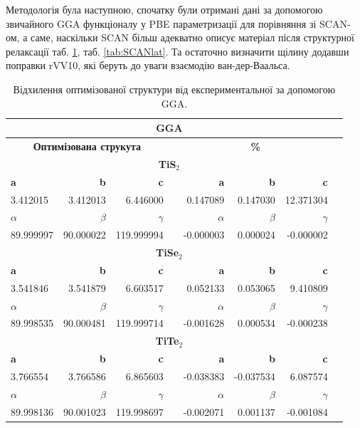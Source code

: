 Методологія була наступною, спочатку були отримані дані за допомогою звичайного GGA функціоналу у PBE параметризації для порівняння зі SCAN-ом, а саме, наскільки SCAN більш адекватно описує матеріал після структурної релаксації таб. \ref{tab:GGAlat}, таб. \ref{tab:SCANlat}. Та остаточно визначити щілину додавши поправки rVV10, які беруть до уваги взаємодію ван-дер-Ваальса.

\begin{table}[!htp]\centering
\scriptsize
\begin{tabular}{lrrrrrrr}\toprule
\multicolumn{7}{c}{\textbf{GGA}} \\\midrule
\multicolumn{3}{c}{\textbf{Оптимізована струкута}} & &\multicolumn{3}{c}{\textbf{\%}} \\
\multicolumn{7}{c}{\textbf{TiS$_2$}} \\
\textbf{a} &\textbf{b} &\textbf{c} & &\textbf{a} &\textbf{b} &\textbf{c} \\
3.412015 &3.412013 &6.446000 & &0.147089 &0.147030 &12.371304 \\
\textbf{$\alpha$} &\textbf{$\beta$} &\textbf{$\gamma$} & &\textbf{$\alpha$} &\textbf{$\beta$} &\textbf{$\gamma$} \\
89.999997 &90.000022 &119.999994 & &-0.000003 &0.000024 &-0.000002 \\
\multicolumn{7}{c}{\textbf{TiSe$_2$}} \\
\textbf{a} &\textbf{b} &\textbf{c} & &\textbf{a} &\textbf{b} &\textbf{c} \\
3.541846 &3.541879 &6.603517 & &0.052133 &0.053065 &9.410809 \\
\textbf{$\alpha$} &\textbf{$\beta$} &\textbf{$\gamma$} & &\textbf{$\alpha$} &\textbf{$\beta$} &\textbf{$\gamma$} \\
89.998535 &90.000481 &119.999714 & &-0.001628 &0.000534 &-0.000238 \\
\multicolumn{7}{c}{\textbf{TiTe$_2$}} \\
\textbf{a} &\textbf{b} &\textbf{c} & &\textbf{a} &\textbf{b} &\textbf{c} \\
3.766554 &3.766586 &6.865603 & &-0.038383 &-0.037534 &6.087574 \\
\textbf{$\alpha$} &\textbf{$\beta$} &\textbf{$\gamma$} & &\textbf{$\alpha$} &\textbf{$\beta$} &\textbf{$\gamma$} \\
89.998136 &90.001023 &119.998697 & &-0.002071 &0.001137 &-0.001084 \\
\bottomrule
\end{tabular}
\caption{Відхилення оптимізованої структури від експериментальної за допомогою GGA.}\label{tab:GGAlat}
\end{table}


